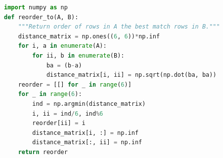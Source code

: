  
 
\lstset{style=mystyle}

\begin{lstlisting}[language=Python, label={lst:reorder_to}, caption="Python code for sorting rows of matrix $\matr{A}$ to match those of $\matr{B}$"]
import numpy as np
def reorder_to(A, B):
    """Return order of rows in A the best match rows in B."""
    distance_matrix = np.ones((6, 6))*np.inf
    for i, a in enumerate(A):
        for ii, b in enumerate(B):
            ba = (b-a)
            distance_matrix[i, ii] = np.sqrt(np.dot(ba, ba))
    reorder = [[] for _ in range(6)]
    for _ in range(6):
        ind = np.argmin(distance_matrix)
        i, ii = ind/6, ind%6
        reorder[ii] = i
        distance_matrix[i, :] = np.inf
        distance_matrix[:, ii] = np.inf
    return reorder
\end{lstlisting}